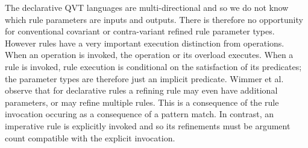 \documentclass[runningheads,a4paper]{llncs}
\begin{document}
The declarative QVT languages are multi-directional and so we do not know which rule parameters are inputs and outputs. There is therefore no opportunity for conventional covariant or contra-variant refined rule parameter types. However rules have a very important execution distinction from operations. When an operation is invoked, the operation or its overload executes. When a rule is invoked, rule execution is conditional on the satisfaction of its predicates; the parameter types are therefore just an implicit predicate. Wimmer et al. \cite{ruleInheritance} observe that for declarative rules a refining rule may even have additional parameters, or may refine multiple rules. This is a consequence of the rule invocation occuring as a consequence of a pattern match. In contrast, an imperative rule is explicitly invoked and so its refinements must be argument count compatible with the explicit invocation. 







\end{document}
